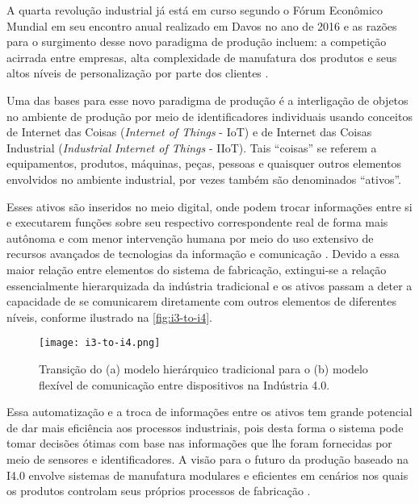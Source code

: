 	A quarta revolução industrial já está em curso segundo o Fórum Econômico Mundial \cite{schwab2016fourth} em seu encontro anual realizado em Davos no ano de 2016 e as razões para o surgimento desse novo paradigma de produção incluem: a competição acirrada entre empresas, alta complexidade de manufatura dos produtos e seus altos níveis de personalização por parte dos clientes \cite{bordeleau2018bi, vaidya2018industryfour}.

	Uma das bases para esse novo paradigma de produção é a interligação de objetos no ambiente de produção por meio de identificadores individuais usando conceitos de Internet das Coisas (\textit{Internet of Things} - IoT) e de Internet das Coisas Industrial (\textit{Industrial Internet of Things} - IIoT). Tais ``coisas'' se referem a equipamentos, produtos, máquinas, peças, pessoas e quaisquer outros elementos envolvidos no ambiente industrial, por vezes também são denominados ``ativos''.
	
	Esses ativos são inseridos no meio digital, onde podem trocar informações entre si e executarem funções sobre seu respectivo correspondente real de forma mais autônoma e com menor intervenção humana por meio do uso extensivo de recursos avançados de tecnologias da informação e comunicação \cite{adolph2018roadmap}. Devido a essa maior relação entre elementos do sistema de fabricação, extingui-se a relação essencialmente hierarquizada da indústria tradicional e os ativos passam a deter a capacidade de se comunicarem diretamente com outros elementos de diferentes níveis, conforme ilustrado na \autoref{fig:i3-to-i4}.
	
	\begin{figure}[htb]
		\centering
		\caption{Transição do (a) modelo hierárquico tradicional para o (b) modelo flexível de comunicação entre dispositivos na Indústria 4.0.}
		\label{fig:i3-to-i4}
		\texttt{[image: i3-to-i4.png]}
	\end{figure}

	Essa automatização e a troca de informações entre os ativos tem grande potencial de dar mais eficiência aos processos industriais, pois desta forma o sistema pode tomar decisões ótimas com base nas informações que lhe foram fornecidas por meio de sensores e identificadores. A visão para o futuro da produção baseado na I4.0 envolve sistemas de manufatura modulares e eficientes em cenários nos quais os produtos controlam seus próprios processos de fabricação \cite{lasi2014industryfour}.
	
